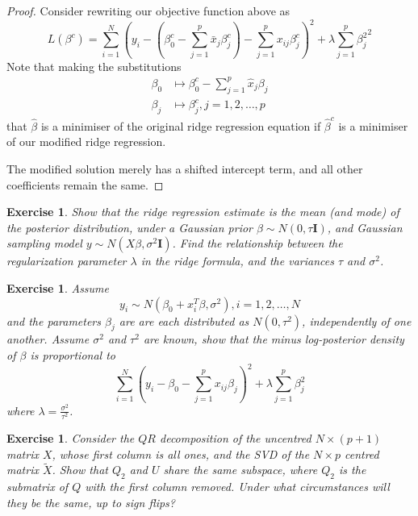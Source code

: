 \documentclass[12pt]{amsart}
\theoremstyle{plain}%
\newtheorem{exer}[thm]{Exercise}
\theoremstyle{definition}
\theoremstyle{remark}
\begin{document}
\begin{proof}
    Consider rewriting our objective function above as  \[
        L(\beta^c) = \sum_{i=1}^{N}\left(y_i - \left(\beta_0^c - \sum_{j=1}^{p} \bar x_j \beta_j^c \right) - \sum_{j=1}^p x_{ij} \beta_j^c \right)^2 + \lambda \sum_{j=1}^p {\beta_j^2}^2
        \]
    Note that making the substitutions \begin{align*}
        \beta_0 &\mapsto \beta_0^c - \sum_{j=1}^p \hat x_j \beta_j \\
        \beta_j &\mapsto \beta^c_j, j = 1, 2, \dots, p
    \end{align*} that $\hat \beta$ is a minimiser of the original ridge regression equation if $\hat \beta^c$ is a minimiser of our modified ridge regression.  

    The modified solution merely has a shifted intercept term, and all other coefficients remain the same.  
\end{proof}

\begin{exer}
    Show that the ridge regression estimate is the mean (and mode) of the posterior distribution, under a Gaussian prior $\beta \sim N(0, \tau \mathbf{I})$, and Gaussian sampling model $y \sim N(X \beta, \sigma^2 \mathbf{I})$.  Find the relationship between the regularization parameter $\lambda$ in the ridge formula, and the variances $\tau$ and $\sigma^2$.
\end{exer}

\begin{exer}
    Assume 
    \[ y_i \sim N(\beta_0 + x_i^T \beta, \sigma^2), i = 1, 2, \dots, N \] and the parameters $\beta_j$ are are each distributed as $N(0, \tau^2)$, independently of one another.  Assume $\sigma^2$ and $\tau^2$ are known, show that the minus log-posterior density of $\beta$ is proportional to 
    \[ \sum_{i=1}^N \left( y_i - \beta_0 - \sum_{j=1}^p x_{ij} \beta_j \right)^2 + \lambda \sum_{j=1}^p \beta_j^2 \]
    where $\lambda = \frac{\sigma^2}{\tau^2}$.  
\end{exer}

\begin{exer}
    Consider the $QR$ decomposition of the uncentred $N \times (p+1)$ matrix $X$, whose first column is all ones, and the SVD of the $N \times p$ centred matrix $\tilde X$.  Show that $Q_2$ and $U$ share the same subspace, where $Q_2$ is the submatrix of $Q$ with the first column removed.  Under what circumstances will they be the same, up to sign flips?
\end{exer}
\end{document}
